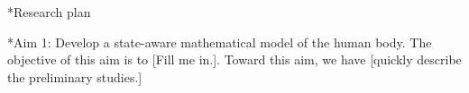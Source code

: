 \documentclass[12pt]{article}
\makeatletter
\renewcommand\subsection{\@startsection
	{subsection}{2}{0mm}
	{-0.05in}
	{-0.5\baselineskip}
	{\normalfont\normalsize\bfseries}}
\renewcommand\section{\@startsection
	{subsection}{2}{0mm}
	{-0.2in}
	{0.05\baselineskip}
	{\normalfont\large\bfseries}}
\makeatother
\begin{document}

\section*{Research plan}

\subsection*{Aim 1: Develop a state-aware mathematical model of the human body.}
The objective of this aim is to [Fill me in.]. Toward this aim, we have [quickly describe the preliminary studies.]
\end{document}
